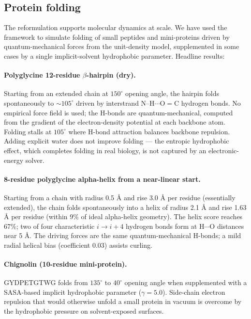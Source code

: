 \documentclass[11pt]{article}
\begin{document}
\subsection{Protein folding}\label{sec:proteins}

The reformulation supports molecular dynamics at scale. We have used the framework to simulate folding of small peptides and mini-proteins driven by quantum-mechanical forces from the unit-density model, supplemented in some cases by a single implicit-solvent hydrophobic parameter. Headline results:

\paragraph{Polyglycine 12-residue $\beta$-hairpin (dry).}
Starting from an extended chain at $150^\circ$ opening angle, the hairpin folds spontaneously to ${\sim}105^\circ$ driven by interstrand N--H$\cdots$O$=$C hydrogen bonds. No empirical force field is used; the H-bonds are quantum-mechanical, computed from the gradient of the electron-density potential at each backbone atom. Folding stalls at $105^\circ$ where H-bond attraction balances backbone repulsion. Adding explicit water does not improve folding --- the entropic hydrophobic effect, which completes folding in real biology, is not captured by an electronic-energy solver.

\paragraph{8-residue polyglycine alpha-helix from a near-linear start.}
Starting from a chain with radius 0.5 \AA{} and rise 3.0 \AA{} per residue (essentially extended), the chain folds spontaneously into a helix of radius 2.1 \AA{} and rise 1.63 \AA{} per residue (within 9\% of ideal alpha-helix geometry). The helix score reaches 67\%; two of four characteristic $i \to i{+}4$ hydrogen bonds form at H$\cdots$O distances near 5 \AA. The driving forces are the same quantum-mechanical H-bonds; a mild radial helical bias (coefficient 0.03) assists curling.

\paragraph{Chignolin (10-residue mini-protein).}
GYDPETGTWG folds from $135^\circ$ to $40^\circ$ opening angle when supplemented with a SASA-based implicit hydrophobic parameter ($\gamma = 5.0$). Side-chain electron repulsion that would otherwise unfold a small protein in vacuum is overcome by the hydrophobic pressure on solvent-exposed surfaces.
\end{document}
